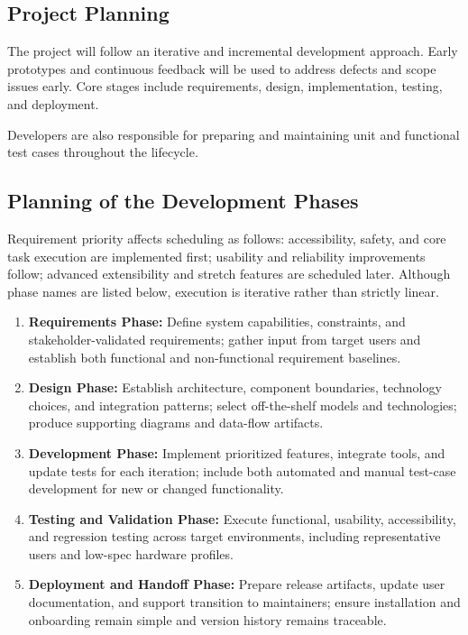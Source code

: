 \documentclass[12pt]{article}
\begin{document}
\subsection{Project Planning}
The project will follow an iterative and incremental development
approach. Early prototypes and continuous feedback will be used to
address defects and scope issues early. Core stages include
requirements, design, implementation, testing, and deployment.

Developers are also responsible for preparing and maintaining unit and
functional test cases throughout the lifecycle.

\subsection{Planning of the Development Phases}
Requirement priority affects scheduling as follows: accessibility,
safety, and core task execution are implemented first; usability and
reliability improvements follow; advanced extensibility and stretch
features are scheduled later. Although phase names are listed below,
execution is iterative rather than strictly linear.

\begin{enumerate}
  \item \textbf{Requirements Phase:} Define system capabilities,
  constraints, and stakeholder-validated requirements; gather input
  from target users and establish both functional and non-functional
  requirement baselines.
  \item \textbf{Design Phase:} Establish architecture, component
  boundaries, technology choices, and integration patterns; select
  off-the-shelf models and technologies; produce supporting diagrams
  and data-flow artifacts.
  \item \textbf{Development Phase:} Implement prioritized features,
  integrate tools, and update tests for each iteration; include both
  automated and manual test-case development for new or changed
  functionality.
  \item \textbf{Testing and Validation Phase:} Execute functional,
  usability, accessibility, and regression testing across target
  environments, including representative users and low-spec hardware
  profiles.
  \item \textbf{Deployment and Handoff Phase:} Prepare release
  artifacts, update user documentation, and support transition to
  maintainers; ensure installation and onboarding remain simple and
  version history remains traceable.
\end{enumerate}
\end{document}
